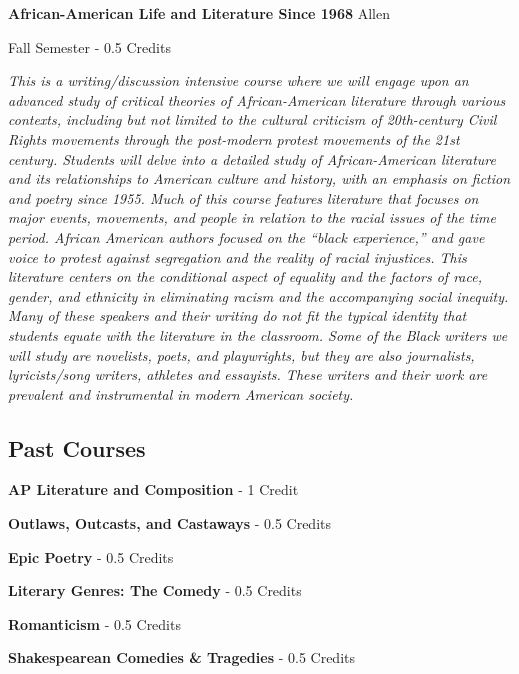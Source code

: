 \noindent\textbf{African-American Life and Literature Since 1968} \hfill Allen

\noindent Fall Semester - 0.5 Credits

\vspace{1mm}\emph{This is a writing/discussion intensive course where we will engage upon an advanced study of critical theories of African-American literature through various contexts, including but not limited to the cultural criticism of 20th-century Civil Rights movements through the post-modern protest movements of the 21st century. Students will delve into a detailed study of African-American literature and its relationships to American culture and history, with an emphasis on fiction and poetry since 1955. Much of this course features literature that focuses on major events, movements, and people in relation to the racial issues of the time period. African American authors focused on the ``black experience,'' and gave voice to protest against segregation and the reality of racial injustices. This literature centers on the conditional aspect of equality and the factors of race, gender, and ethnicity in eliminating racism and the accompanying social inequity. Many of these speakers and their writing do not fit the typical identity that students equate with the literature in the classroom. Some of the Black writers we will study are novelists, poets, and playwrights, but they are also journalists, lyricists/song writers, athletes and essayists. These writers and their work are prevalent and instrumental in modern American society.}\\

\subsection{Past Courses}
\noindent\textbf{AP Literature and Composition}  - 1 Credit

\vspace{3mm}\noindent\textbf{Outlaws, Outcasts, and Castaways}  - 0.5 Credits


\vspace{3mm}\noindent\textbf{Epic Poetry}  - 0.5 Credits


\vspace{3mm}\noindent\textbf{Literary Genres:  The Comedy}  - 0.5 Credits

\vspace{3mm}\noindent\textbf{Romanticism}  - 0.5 Credits

\vspace{3mm}\noindent\textbf{Shakespearean Comedies \& Tragedies}  - 0.5 Credits

\vspace{3mm}